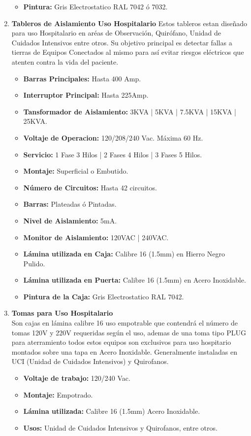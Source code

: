 \documentclass[11pt,letterpaper]{article}
\begin{document}
\begin{enumerate}
\begin{itemize}
			\item \textbf{Pintura:} Gris Electrostatico RAL 7042 ó 7032.
		\end{itemize}
	\item \textbf{Tableros de Aislamiento Uso Hospitalario}
		Estos tableros estan diseñado para uso Hospitalario en aréas de Observación, Quirófano, Unidad de Cuidados Intensivos entre otros. Su objetivo principal es detectar fallas a tierras de Equipos Conectados al mismo para así evitar riesgos eléctricos que atenten contra la vida del paciente.
		\begin{itemize}
			\item \textbf{Barras Principales:} Hasta 400 Amp.
			\item \textbf{Interruptor Principal:} Hasta 225Amp.
			\item \textbf{Tansformador de Aislamiento:} 3KVA | 5KVA | 7.5KVA | 15KVA | 25KVA.
			\item \textbf{Voltaje de Operacion:} 120/208/240 Vac. Máxima 60 Hz.
			\item \textbf{Servicio:} 1 Fase 3 Hilos | 2 Fases 4 Hilos | 3 Fases 5 Hilos.
			\item \textbf{Montaje:} Superficial o Embutido.
			\item \textbf{Número de Circuitos:} Hasta 42 circuitos.
			\item \textbf{Barras:} Plateadas ó Pintadas.
			\item \textbf{Nivel de Aislamiento:} 5mA.
			\item \textbf{Monitor de Aislamiento:} 120VAC | 240VAC.
			\item \textbf{Lámina utilizada en Caja:} Calibre 16 (1.5mm) en Hierro Negro Pulido.
			\item \textbf{Lámina utilizada en Puerta:} Calibre 16 (1.5mm) en Acero Inoxidable.
			\item \textbf{Pintura de la Caja:} Gris Electrostatico RAL 7042.
		\end{itemize}
	\item \textbf{Tomas para Uso Hospitalario}\\
		Son cajas en lámina calibre 16 uso empotrable que contendrá el número de tomas 120V y 220V requeridas según el uso, ademas de una toma tipo PLUG para aterramiento todos estos equipos son exclusivos para uso hospitario montados sobre una tapa en Acero Inoxidable. Generalmente instaladas en UCI (Unidad de Cuidados Intensivos) y Quirofanos.
		\begin{itemize}
			\item \textbf{Voltaje de trabajo:} 120/240 Vac.
			\item \textbf{Montaje:} Empotrado.
			\item \textbf{Lámina utilizada:} Calibre 16 (1.5mm) Acero Inoxidable.
		 	\item \textbf{Usos:} Unidad de Cuidados Intensivos y Quirofanos, entre otros.
		\end{itemize}
		

\end{enumerate}
\end{document}

